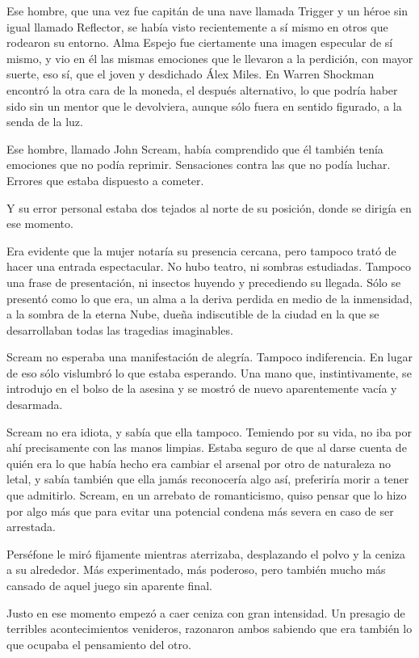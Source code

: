 Ese hombre, que una vez fue capitán de una nave llamada Trigger y un héroe sin igual llamado Reflector, se había visto recientemente a sí mismo en otros que rodearon su entorno. Alma Espejo fue ciertamente una imagen especular de sí mismo, y vio en él las mismas emociones que le llevaron a la perdición, con mayor suerte, eso sí, que el joven y desdichado Álex Miles. En Warren Shockman encontró la otra cara de la moneda, el después alternativo, lo que podría haber sido sin un mentor que le devolviera, aunque sólo fuera en sentido figurado, a la senda de la luz.

Ese hombre, llamado John Scream, había comprendido que él también tenía emociones que no podía reprimir. Sensaciones contra las que no podía luchar. Errores que estaba dispuesto a cometer.

Y su error personal estaba dos tejados al norte de su posición, donde se dirigía en ese momento.

Era evidente que la mujer notaría su presencia cercana, pero tampoco trató de hacer una entrada espectacular. No hubo teatro, ni sombras estudiadas. Tampoco una frase de presentación, ni insectos huyendo y precediendo su llegada. Sólo se presentó como lo que era, un alma a la deriva perdida en medio de la inmensidad, a la sombra de la eterna Nube, dueña indiscutible de la ciudad en la que se desarrollaban todas las tragedias imaginables.

Scream no esperaba una manifestación de alegría. Tampoco indiferencia. En lugar de eso sólo vislumbró lo que estaba esperando. Una mano que, instintivamente, se introdujo en el bolso de la asesina y se mostró de nuevo aparentemente vacía y desarmada.

Scream no era idiota, y sabía que ella tampoco. Temiendo por su vida, no iba por ahí precisamente con las manos limpias. Estaba seguro de que al darse cuenta de quién era lo que había hecho era cambiar el arsenal por otro de naturaleza no letal, y sabía también que ella jamás reconocería algo así, preferiría morir a tener que admitirlo. Scream, en un arrebato de romanticismo, quiso pensar que lo hizo por algo más que para evitar una potencial condena más severa en caso de ser arrestada.

Perséfone le miró fijamente mientras aterrizaba, desplazando el polvo y la ceniza a su alrededor. Más experimentado, más poderoso, pero también mucho más cansado de aquel juego sin aparente final.

Justo en ese momento empezó a caer ceniza con gran intensidad. Un presagio de terribles acontecimientos venideros, razonaron ambos sabiendo que era también lo que ocupaba el pensamiento del otro.

